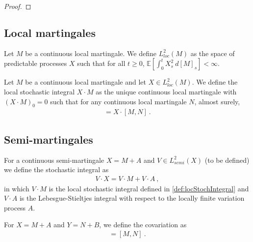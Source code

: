 \begin{proof}

\end{proof}


\subsection{Local martingales}

\begin{definition}[$L^2_{loc}(M)$]\label{def:L2locM}
Let $M$ be a continuous local martingale.
We define $L^2_{loc}(M)$ as the space of predictable processes $X$ such that for all $t \ge 0$, $\mathbb{E}\left[ \int_0^t X_s^2 \: d[M]_s \right] < \infty$.
\end{definition}


\begin{definition}\label{def:locStochIntegral}
Let $M$ be a continuous local martingale and let $X \in L^2_{loc}(M)$.
We define the local stochastic integral $X \cdot M$ as the unique continuous local martingale with $(X \cdot M)_0 = 0$ such that for any continuous local martingale $N$, almost surely,
\begin{align*}
  [X \cdot M, N] = X \cdot [M, N]
  \: .
\end{align*}
\end{definition}


\subsection{Semi-martingales}

\begin{definition}\label{def:stochIntegral}
For a continuous semi-martingale $X = M + A$ and $V \in L^2_{semi}(X)$ (to be defined) we define the stochastic integral as
\begin{align*}
  V \cdot X = V \cdot M + V \cdot A
  \: ,
\end{align*}
in which $V \cdot M$ is the local stochastic integral defined in \ref{def:locStochIntegral} and $V \cdot A$ is the Lebesgue-Stieltjes integral with respect to the locally finite variation process $A$.
\end{definition}


For $X = M + A$ and $Y = N + B$, we define the covariation as
\begin{align*}
  [X, Y] = [M, N]
  \: .
\end{align*}

